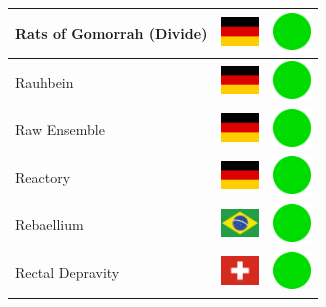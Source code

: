 \documentclass[12pt, a4paper, twoside]{report}
\begin{document}
\begin{center}
\begin{longtable}{|p{5cm}|p{2cm}|p{2cm}|}
 Rats of Gomorrah (Divide)                                  & \includegraphics[width=1cm]{../4x3/de} &   \includegraphics[width=1cm]{../likes/y} \\ \hline
 Rauhbein                                                   & \includegraphics[width=1cm]{../4x3/de} &   \includegraphics[width=1cm]{../likes/y} \\ \hline
 Raw Ensemble                                               & \includegraphics[width=1cm]{../4x3/de} &   \includegraphics[width=1cm]{../likes/y} \\ \hline
 Reactory                                                   & \includegraphics[width=1cm]{../4x3/de} &   \includegraphics[width=1cm]{../likes/y} \\ \hline
 Rebaellium                                                 & \includegraphics[width=1cm]{../4x3/br} &   \includegraphics[width=1cm]{../likes/y} \\ \hline
 Rectal Depravity                                           & \includegraphics[width=1cm]{../4x3/ch} &   \includegraphics[width=1cm]{../likes/y} \\ \hline

\end{longtable}
\end{center}
\end{document}
